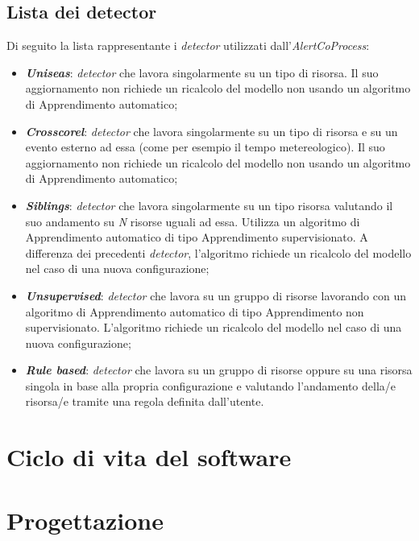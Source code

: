 \subsection{Lista dei detector}\label{sec:detector-alertcoprocess}
Di seguito la lista rappresentante i \textit{detector} utilizzati dall'\textit{AlertCoProcess}:
\begin{itemize}
	\item{\textbf{\textit{Uniseas}}: \textit{detector} che lavora singolarmente su un tipo di risorsa. Il suo aggiornamento non richiede un ricalcolo del modello non usando un algoritmo di \gls{Apprendimento automatico};}
	\item{\textbf{\textit{Crosscorel}}: \textit{detector} che lavora singolarmente su un tipo di risorsa e su un evento esterno ad essa (come per esempio il tempo metereologico). Il suo aggiornamento non richiede un ricalcolo del modello non usando un algoritmo di \gls{Apprendimento automatico};}
	\item{\textbf{\textit{Siblings}}: \textit{detector} che lavora singolarmente su un tipo risorsa valutando il suo andamento su \textit{N} risorse uguali ad essa. Utilizza un algoritmo di \gls{Apprendimento automatico} di tipo \gls{Apprendimento supervisionato}. A differenza dei precedenti \textit{detector}, l'algoritmo richiede un ricalcolo del modello nel caso di una nuova configurazione;}
	\item{\textbf{\textit{Unsupervised}}: \textit{detector} che lavora su un gruppo di risorse lavorando con un algoritmo di \gls{Apprendimento automatico} di tipo \gls{Apprendimento non supervisionato}. L'algoritmo richiede un ricalcolo del modello nel caso di una nuova configurazione;}
	\item{\textbf{\textit{Rule based}}: \textit{detector} che lavora su un gruppo di risorse oppure su una risorsa singola in base alla propria configurazione e valutando l'andamento della/e risorsa/e tramite una regola definita dall'utente.}
\end{itemize}

\section{Ciclo di vita del software}
\label{sec:ciclo-vita-software}

\section{Progettazione}
\label{sec:progettazione}

